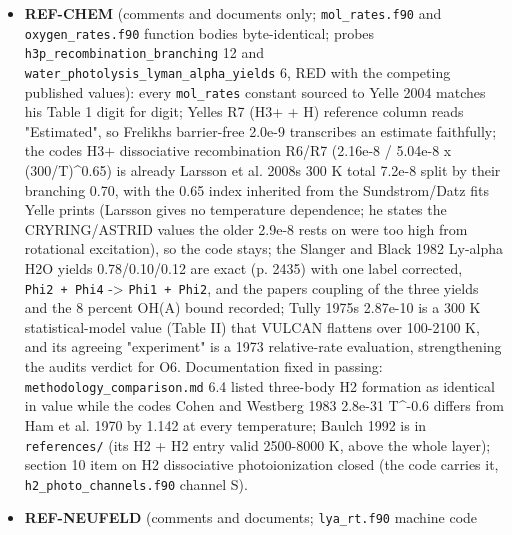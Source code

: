 \documentclass[english,a4paper]{my_memo}
\begin{document}
\begin{itemize}
  decision with a third option). One gap stated: the source projection
  l\_1 C (gravity and the spherical divergence, Thompson 1990 footnote 1 and
  Eq. (52); the steady form is L\_1 = -rho c g\_1, not 0) survives only
  because both states of (C-) sit at the same radius; any reformulation
  relating cell 1\textquotesingle s centre to the face must restore it. Carlson\textquotesingle s "but not U
  and p" marked unverified against the primaries.
\item
  \textbf{REF-CHEM} (comments and documents only; \texttt{mol\_rates.f90} and
  \texttt{oxygen\_rates.f90} function bodies byte-identical; probes
  \texttt{h3p\_recombination\_branching} 12 and \texttt{water\_photolysis\_lyman\_alpha\_yields}
  6, RED with the competing published values): every \texttt{mol\_rates} constant
  sourced to Yelle 2004 matches his Table 1 digit for digit; Yelle\textquotesingle s R7
  (H3+ + H) reference column reads "Estimated", so Frelikh\textquotesingle s barrier-free
  2.0e-9 transcribes an estimate faithfully; the code\textquotesingle s H3+ dissociative
  recombination R6/R7 (2.16e-8 / 5.04e-8 x (300/T)\^{}0.65) is already Larsson
  et al. 2008\textquotesingle s 300 K total 7.2e-8 split by their branching 0.70, with the
  0.65 index inherited from the Sundstrom/Datz fits Yelle prints (Larsson
  gives no temperature dependence; he states the CRYRING/ASTRID values the
  older 2.9e-8 rests on were too high from rotational excitation), so the
  code stays; the Slanger and Black 1982 Ly-alpha H2O yields 0.78/0.10/0.12
  are exact (p. 2435) with one label corrected, \texttt{Phi2\ +\ Phi4} -\textgreater{} \texttt{Phi1\ +\ Phi2}, and the paper\textquotesingle s coupling of the three yields and the 8 percent
  OH(A) bound recorded; Tully 1975\textquotesingle s 2.87e-10 is a 300 K statistical-model
  value (Table II) that VULCAN flattens over 100-2100 K, and its agreeing
  "experiment" is a 1973 relative-rate evaluation, strengthening the
  audit\textquotesingle s verdict for O6. Documentation fixed in passing: \texttt{methodology\_comparison.md}
  6.4 listed three-body H2 formation as identical in value while the code\textquotesingle s
  Cohen and Westberg 1983 2.8e-31 T\^{}-0.6 differs from Ham et al. 1970 by
  1.142 at every temperature; Baulch 1992 is in \texttt{references/} (its H2 + H2
  entry valid 2500-8000 K, above the whole layer); section 10 item on H2
  dissociative photoionization closed (the code carries it,
  \texttt{h2\_photo\_channels.f90} channel S).
\item
  \textbf{REF-NEUFELD} (comments and documents; \texttt{lya\_rt.f90} machine code

\end{itemize}
\end{document}
